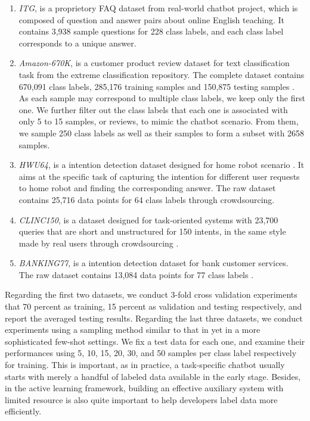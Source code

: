 \begin{enumerate}
  \item \emph{ITG},  is  a proprietory FAQ dataset from real-world
  chatbot  project,  which is composed of question and answer pairs about online
  English teaching. It contains 3,938 sample questions for 228 class labels, and
  each class label corresponds to a unique answer.

  \item \emph{Amazon-670K}, is a customer product review dataset for
  text  classification  task  from  the  extreme  classification repository. The
  complete  dataset  contains 670,091 class labels, 285,176 training samples and
  150,875   testing   samples   \cite{bhatia2016extreme}.  As  each  sample  may
  correspond  to  multiple  class labels, we keep only the first one. We further
  filter  out the class labels that each one is associated with only 5 to 15 samples,
  or  reviews,  to  mimic  the  chatbot scenario. From them, we sample 250 class
  labels as well as their samples to form a subset with 2658 samples.

  \item \emph{HWU64}, is a intention detection dataset designed for
  home  robot  scenario \cite{liu2019benchmarking}. It aims at the specific task
  of  capturing  the  intention  for  different  user requests to home robot and
  finding  the corresponding answer. The raw dataset contains 25,716 data points
  for 64 class labels through crowdsourcing.

  \item \emph{CLINC150},  is  a dataset designed for task-oriented
  systems  with  23,700 queries that are short and unstructured for 150 intents,
  in    the    same   style   made   by   real   users   through   crowdsourcing
  \cite{larson2019evaluation}.

  \item \emph{BANKING77}, is a intention detection dataset for bank
  customer  services.  The  raw dataset contains 13,084 data points for 77 class
  labels \cite{casanueva2020efficient}.
\end{enumerate}

Regarding  the first two datasets, we conduct 3-fold cross validation experiments
that   70   percent   as  training,  15  percent  as  validation  and  testing
respectively,  and  report  the  averaged  testing results. Regarding the last
three datasets, we conduct experiments using a sampling method similar to that
in   \cite{casanueva2020efficient}   yet  in  a  more  sophisticated  few-shot
settings.  We  fix  a  test  data for each one, and examine their performances
using  5,  10,  15,  20,  30,  and 50 samples per class label respectively for
training.  This  is important, as in practice, a task-specific chatbot usually
starts  with  merely  a  handful of labeled data available in the early stage.
Besides,  in  the  active  learning framework, building an effective auxiliary
system  with limited resource is also quite important to help developers label
data more efficiently.

